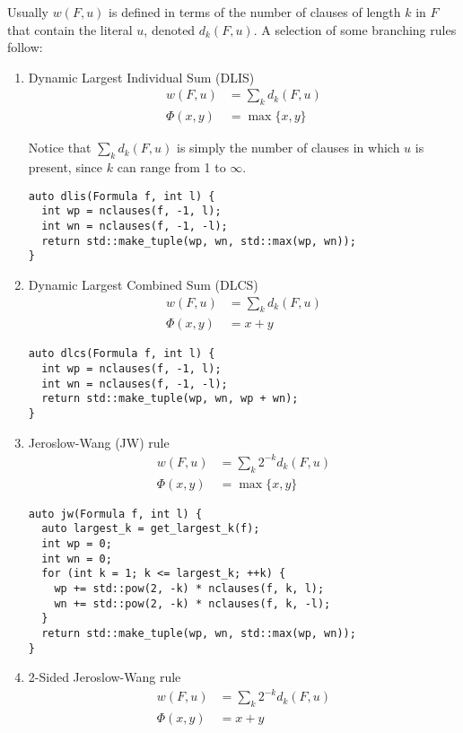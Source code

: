 \documentclass[10pt,AMS Euler]{article}
\begin{document}
Usually \(w(F,u)\) is defined in terms of the number of clauses of length \(k\) in \(F\) that contain the
literal \(u\), denoted \(d_k(F, u)\). A selection of some branching rules follow:
\begin{enumerate}
\item Dynamic Largest Individual Sum (DLIS)
\label{sec:orgdcf0a4b}
\begin{align*}
w(F,u) &= \sum_k d_k(F,u) \\
\Phi(x,y) &= \max\{x,y\}
\end{align*}

Notice that \(\sum_k d_k(F,u)\) is simply the number of clauses in which \(u\) is present,
since \(k\) can range from 1 to \(\infty\).
\begin{verbatim}
auto dlis(Formula f, int l) {
  int wp = nclauses(f, -1, l);
  int wn = nclauses(f, -1, -l);
  return std::make_tuple(wp, wn, std::max(wp, wn));
}
\end{verbatim}
\item Dynamic Largest Combined Sum (DLCS)
\label{sec:org94eaf55}
\begin{align*}
w(F,u) &= \sum_k d_k(F,u) \\
\Phi(x,y) &= x + y
\end{align*}
\begin{verbatim}
auto dlcs(Formula f, int l) {
  int wp = nclauses(f, -1, l);
  int wn = nclauses(f, -1, -l);
  return std::make_tuple(wp, wn, wp + wn);
}
\end{verbatim}
\item Jeroslow-Wang (JW) rule
\label{sec:orgddf561c}
\begin{align*}
w(F,u) &= \sum_k 2^{-k} d_k(F,u) \\
\Phi(x,y) &= \max\{x,y\}
\end{align*}
\begin{verbatim}
auto jw(Formula f, int l) {
  auto largest_k = get_largest_k(f);
  int wp = 0;
  int wn = 0;
  for (int k = 1; k <= largest_k; ++k) {
    wp += std::pow(2, -k) * nclauses(f, k, l);
    wn += std::pow(2, -k) * nclauses(f, k, -l);
  }
  return std::make_tuple(wp, wn, std::max(wp, wn));
}
\end{verbatim}
\item 2-Sided Jeroslow-Wang rule
\label{sec:org9570d33}
\begin{align*}
w(F,u) &= \sum_k 2^{-k} d_k(F,u) \\
\Phi(x,y) &= x + y
\end{align*}
\begin{verbatim}

\end{verbatim}
\end{enumerate}
\end{document}
